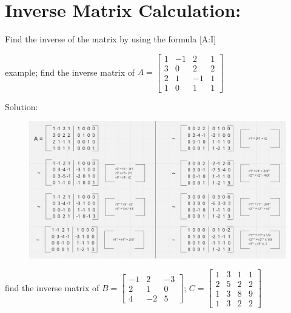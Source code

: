 \documentclass{article}
\begin{document}
    \newpage
    \section*{Inverse Matrix Calculation:}
    \vspace{10pt}
    Find the inverse of the matrix by using the formula [A:I]

    \vspace{10pt}
    example; find the inverse matrix of \( A = \begin{bmatrix} 1 & -1 & 2 & 1 \\ 3 & 0 & 2 & 2 \\ 2 & 1 & -1 & 1 \\ 1 & 0 & 1 & 1 \end{bmatrix} \)

    \vspace{10pt}
    Solution:
    \vspace{10pt}
    \begin{figure}[htbp]
        \centering
        \includegraphics[width=1.2\textwidth, height=.7\textheight]{../Asset/invEXA.png}        \label{fig:example}
    \end{figure}

    \vspace{10pt}
    \newpage

    find the inverse matrix of
    \hspace*{10pt}
    \( B = \begin{bmatrix} -1 & 2 & -3 \\ 2 & 1 & 0 \\ 4 & -2 & 5 \end{bmatrix} \);  
    \( C = \begin{bmatrix} 1 & 3 & 1 & 1 \\ 2 & 5 & 2 & 2 \\ 1 & 3 & 8 & 9 \\ 1 & 3 & 2 & 2 \end{bmatrix} \)
    
\end{document}
